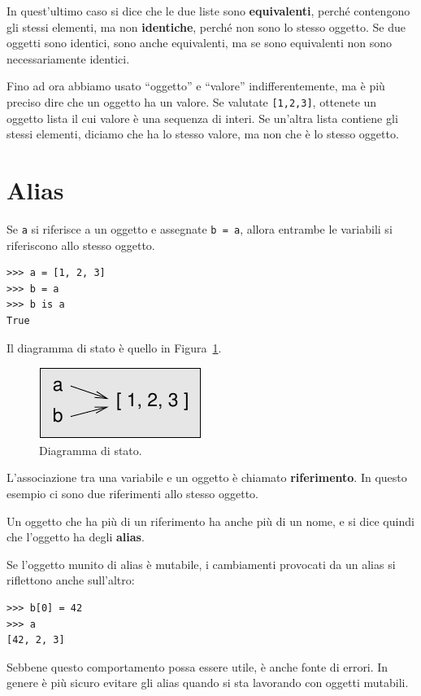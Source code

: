 \documentclass[10pt]{book}
\begin{document}
In quest'ultimo caso si dice che le due liste sono {\bf equivalenti},
perché contengono gli stessi elementi, ma non {\bf identiche}, perché non sono lo stesso oggetto.
Se due oggetti sono identici, sono anche equivalenti, ma se sono equivalenti non sono necessariamente identici.

Fino ad ora abbiamo usato ``oggetto'' e ``valore'' indifferentemente, ma è più preciso dire che un oggetto ha un valore.  Se valutate {\tt [1,2,3]}, ottenete un oggetto lista il cui valore è una sequenza di interi. Se un'altra lista contiene gli stessi elementi, diciamo che ha lo stesso valore, ma non che è lo stesso oggetto.


\section{Alias}

Se {\tt a} si riferisce a un oggetto e assegnate {\tt b = a},
allora entrambe le variabili si riferiscono allo stesso oggetto.

\begin{verbatim}
>>> a = [1, 2, 3]
>>> b = a
>>> b is a
True
\end{verbatim}
%
Il diagramma di stato è quello in Figura~\ref{fig.list3}.

\begin{figure}
\centerline
{\includegraphics[scale=0.8]{figs/list3.pdf}}
\caption{Diagramma di stato.}
\label{fig.list3}
\end{figure}

L'associazione tra una variabile e un oggetto è chiamato {\bf
riferimento}. In questo esempio ci sono due riferimenti allo stesso oggetto.

Un oggetto che ha più di un riferimento ha anche più di un nome, e si dice quindi che l'oggetto ha degli {\bf alias}.

Se l'oggetto munito di alias è mutabile, i cambiamenti provocati da un alias si riflettono anche sull'altro:

\begin{verbatim}
>>> b[0] = 42
>>> a
[42, 2, 3]
\end{verbatim}
%
Sebbene questo comportamento possa essere utile, è anche fonte di errori. In genere è più sicuro evitare gli alias quando si sta lavorando con oggetti mutabili.
\end{document}
